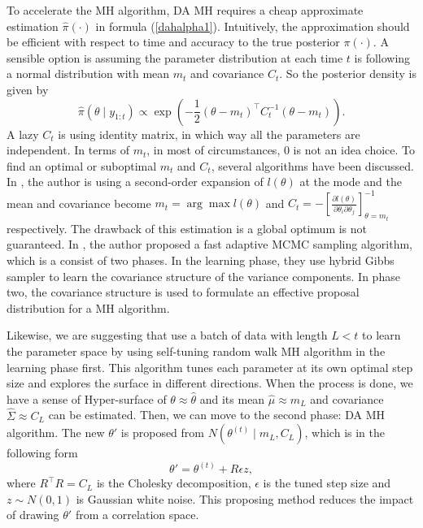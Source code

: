 To accelerate the MH algorithm, DA MH requires a cheap approximate estimation $\hat{\pi}(\cdot)$ in formula (\ref{dahalpha1}). Intuitively, the approximation should be efficient with respect to time and accuracy to the true posterior $\pi(\cdot)$. A sensible option is assuming the parameter distribution at each time $t$ is following a normal distribution with mean $m_t$ and covariance $C_t$. So the posterior density is given by 
\begin{equation*}
\hat{\pi}(\theta\mid y_{1:t}) \propto \exp\left( -\frac{1}{2}(\theta-m_t)^\top C_t^{-1}(\theta-m_t)\right). 
\end{equation*}
A lazy $C_t$ is using identity matrix, in which way all the parameters are independent. In terms of $m_t$, in most of circumstances, 0 is not an idea choice. To find an optimal or suboptimal $m_t$ and $C_t$, several algorithms have been discussed. In \cite{stroud2016bayesian}, the author is using a second-order expansion of $l(\theta)$ at the mode and the mean and covariance become $m_t=\arg \max l(\theta)$ and $C_t = - \left[ \frac{\partial l(\theta)}{\partial \theta_i \partial \theta_j} \right]_{\theta=m_t}^{-1}$ respectively. The drawback of this estimation is a global optimum is not guaranteed. In \cite{mathew2012bayesian}, the author proposed a fast adaptive MCMC sampling algorithm, which is a consist of two phases. In the learning phase, they use hybrid Gibbs sampler to learn the covariance structure of the variance components. In phase two, the covariance structure is used to formulate an effective proposal distribution for a MH algorithm. 


Likewise, we are suggesting that use a batch of data with length $L<t$ to learn the parameter space by using self-tuning random walk MH algorithm in the learning phase first. This algorithm tunes each parameter at its own optimal step size and explores the surface in different directions. When the process is done, we have a sense of Hyper-surface of $\theta\approx\hat{\theta}$ and its mean $\hat{\mu}\approx m_L$ and covariance $\hat{\Sigma}\approx C_L$ can be estimated. Then, we can move to the second phase: DA MH algorithm. The new $\theta'$ is proposed from  $N\left(\theta^{(t)}\mid m_L,C_L\right)$, which is in the following form 
\begin{equation}
\theta' = \theta^{(t)} + R\epsilon z,
\end{equation}
where $R^\top R = C_L$ is the Cholesky decomposition, $\epsilon$ is the tuned step size and $z\sim N(0,1)$ is Gaussian white noise. This proposing method reduces the impact of drawing $\theta'$ from a correlation space. 


